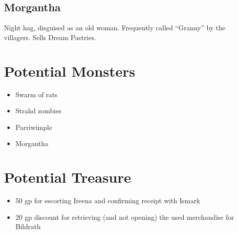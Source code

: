 \documentclass[a4paper,11pt]{article}
\begin{document}
\subsection{Morgantha}
  Night hag, disguised as an old woman. Frequently called ``Granny'' by the villagers. Sells Dream Pastries.


\section{Potential Monsters}
\label{sec:PotentialMonsters}
\begin{itemize}
  \item Swarm of rats
  \item Strahd zombies
  \item Parriwimple
  \item Morgantha
\end{itemize}


\section{Potential Treasure}
\label{sec:PotentialTreasure}
\begin{itemize}
  \item 50 gp for escorting Ireena and confirming receipt with Ismark
  \item 20 gp discount for retrieving (and not opening) the used merchandise for Bildrath
\end{itemize}
\end{document}
